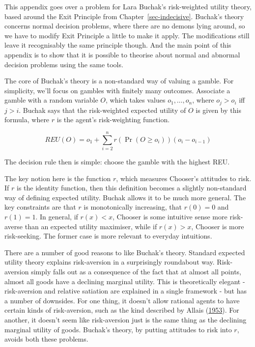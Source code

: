 \documentclass[
  12pt,
  letterpaper,
  DIV=11,
  numbers=noendperiod]{scrreprt}
\begin{document}
This appendix goes over a problem for Lara Buchak's risk-weighted
utility theory, based around the Exit Principle from
Chapter~\ref{sec-indecisive}. Buchak's theory concerns normal decision
problems, where there are no demons lying around, so we have to modify
Exit Principle a little to make it apply. The modifications still leave
it recognisably the same principle though. And the main point of this
appendix is to show that it is possible to theorise about normal and
abnormal decision problems using the same tools.

The core of Buchak's theory is a non-standard way of valuing a gamble.
For simplicity, we'll focus on gambles with finitely many outcomes.
Associate a gamble with a random variable \(O\), which takes values
\(o_1, \dots, o_n\), where \(o_j > o_i\) iff \(j > i\). Buchak says that
the risk-weighted expected utility of \(O\) is given by this formula,
where \(r\) is the agent's risk-weighting function.

\[
REU(O) = o_1 + \sum_{i = 2}^n r(\Pr(O \geq o_i))(o_i - o_{i-1})
\]

The decision rule then is simple: choose the gamble with the highest
REU.

The key notion here is the function \(r\), which measures Chooser's
attitudes to risk. If \(r\) is the identity function, then this
definition becomes a slightly non-standard way of defining expected
utility. Buchak allows it to be much more general. The key constraints
are that \(r\) is monotonically increasing, that \(r(0) = 0\) and
\(r(1) = 1\). In general, if \(r(x) < x\), Chooser is some intuitive
sense more risk-averse than an expected utility maximiser, while if
\(r(x) > x\), Chooser is more risk-seeking. The former case is more
relevant to everyday intuitions.

There are a number of good reasons to like Buchak's theory. Standard
expected utility theory explains risk-aversion in a surprisingly
roundabout way. Risk-aversion simply falls out as a consequence of the
fact that at almost all points, almost all goods have a declining
marginal utility. This is theoretically elegant - risk-aversion and
relative satiation are explained in a single framework - but has a
number of downsides. For one thing, it doesn't allow rational agents to
have certain kinds of risk-aversion, such as the kind described by
Allais (\protect\hyperlink{ref-Allais1953}{1953}). For another, it
doesn't seem like risk-aversion just is the same thing as the declining
marginal utility of goods. Buchak's theory, by putting attitudes to risk
into \(r\), avoids both these problems.
\end{document}
